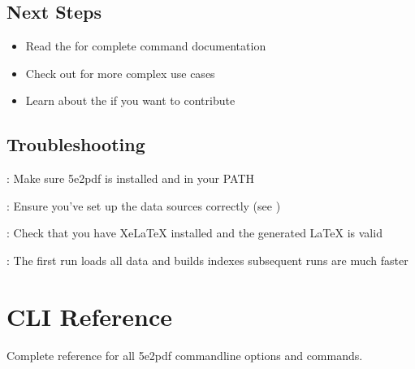 \documentclass[letterpaper,10pt,english]{sphinxmanual}
\begin{document}
\subsection{Next Steps}
\label{\detokenize{user-guide/quickstart:next-steps}}\begin{itemize}
\item {} 
\sphinxAtStartPar
Read the {\hyperref[\detokenize{user-guide/cli-reference::doc}]{}} for complete command documentation

\item {} 
\sphinxAtStartPar
Check out {\hyperref[\detokenize{user-guide/examples::doc}]{}} for more complex use cases

\item {} 
\sphinxAtStartPar
Learn about the {\hyperref[\detokenize{developer/architecture::doc}]{}} if you want to contribute

\end{itemize}


\subsection{Troubleshooting}
\label{\detokenize{user-guide/quickstart:troubleshooting}}
\sphinxAtStartPar
{}: Make sure 5e2pdf is installed and in your PATH

\sphinxAtStartPar
{}: Ensure you’ve set up the data sources correctly (see {\hyperref[\detokenize{user-guide/installation::doc}]{}})

\sphinxAtStartPar
{}: Check that you have XeLaTeX installed and the generated LaTeX is valid

\sphinxAtStartPar
{}: The first run loads all data and builds indexes \sphinxhyphen{} subsequent runs are much faster

\sphinxstepscope


\section{CLI Reference}
\label{\detokenize{user-guide/cli-reference:cli-reference}}\label{\detokenize{user-guide/cli-reference::doc}}
\sphinxAtStartPar
Complete reference for all 5e2pdf command\sphinxhyphen{}line options and commands.
\end{document}
